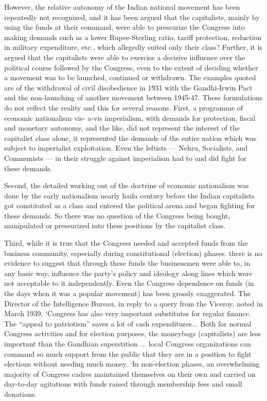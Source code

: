 However, the relative autonomy of the Indian national movement has been repeatedly not recognized, and it has been argued that the capitalists, mainly by using the funds at their command, were able to pressurize the Congress into making demands such as a lower Rupee-Sterling ratio, tariff protection, reduction in military expenditure, etc., which allegedly suited only their class? Further, it is argued that the capitalists were able to exercise a decisive influence over the political course followed by the Congress, even to the extent of deciding whether a movement was to be launched, continued or withdrawn. The examples quoted are of the withdrawal of civil disobedience in 1931 with the Gandhi-Irwin Pact and the non-launching of another movement between 1945-47. These formulations do not reflect the reality and this for several reasons. First, a programme of economic nationalism vis- a-vis imperialism, with demands for protection, fiscal and monetary autonomy, and the like, did not represent the interest of the capitalist class alone, it represented the demands of the entire nation which was subject to imperialist exploitation. Even the leftists — Nehru, Socialists, and Communists — in their struggle against imperialism had to and did fight for these demands. 

Second, the detailed working out of the doctrine of economic nationalism was done by the early nationalism nearly haifa century before the Indian capitalists got constituted as a class and entered the political arena and began fighting for these demands. So there was no question of the Congress being bought, manipulated or pressurized into these positions by the capitalist class. 

Third, while it is true that the Congress needed and accepted funds from the business community, especially during constitutional (election) phases. there is no evidence to suggest that through these funds the businessmen were able to, in any basic way, influence the party's policy and ideology along lines which were not acceptable to it independently. Even the Congress dependence on funds (in the days when it was a popular movement) has been grossly exaggerated. The Director of the Intelligence Bureau, in reply to a query from the Viceroy, noted in March 1939, `Congress has also very important substitutes for regular finance. The ``appeal to patriotism'' saves a lot of cash expenditures... Both for normal Congress activities and for election purposes, the moneybags (capitalists) are less important than the Gandhian superstition ... local Congress organizations can command so much support from the public that they are in a position to fight elections without needing much money. `In non-election phases, an overwhelming majority of Congress cadres maintained themselves on their own and carried on day-to-day agitations with funds raised through membership fees and small donations. 

